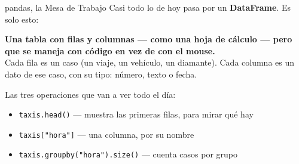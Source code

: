 \documentclass[aspectratio=169, 11pt]{beamer}
\begin{document}
\begin{frame}[shrink=5]{pandas, la Mesa de Trabajo}
  \vspace{2pt}
  {\scriptsize\color{textMuted}
   Casi todo lo de hoy pasa por un \textbf{DataFrame}. Es solo esto:}
  \vspace{2pt}
  \begin{tcolorbox}[colback=arcaGray, colframe=arcaDark, boxrule=0pt,
    leftrule=3pt, arc=3pt, left=9pt, right=9pt, top=4pt, bottom=4pt]
    {\scriptsize\color{arcaDark}\bfseries
     Una tabla con filas y columnas --- como una hoja de cálculo --- pero que
     se maneja con código en vez de con el mouse.}\\[4pt]
    {\scriptsize\color{textMuted}
     Cada fila es un caso (un viaje, un vehículo, un diamante). Cada columna
     es un dato de ese caso, con su tipo: número, texto o fecha.}
  \end{tcolorbox}
  \vspace{2pt}
  {\scriptsize\color{textMuted}
   Las tres operaciones que van a ver todo el día:
  \begin{itemize}\setlength{\itemsep}{3pt}
    \item[{\color{arcaRed}\scriptsize\faArrowRight}]
      \texttt{taxis.head()} --- muestra las primeras filas, para mirar qué hay
    \item[{\color{arcaRed}\scriptsize\faArrowRight}]
      \texttt{taxis["hora"]} --- una columna, por su nombre
    \item[{\color{arcaRed}\scriptsize\faArrowRight}]
      \texttt{taxis.groupby("hora").size()} --- cuenta casos por grupo
  \end{itemize}}
\end{frame}
\end{document}
